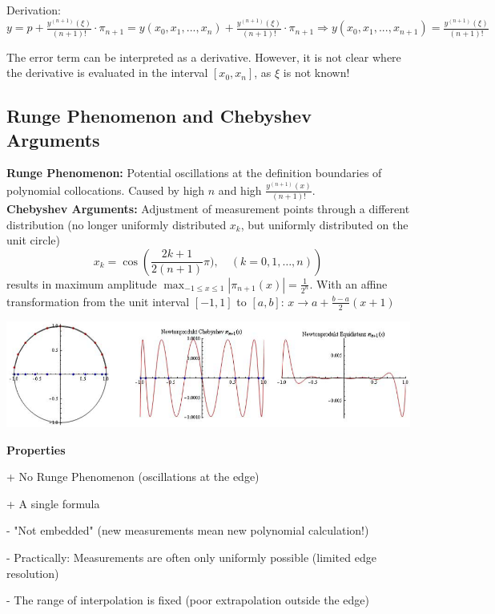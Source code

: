 Derivation: $y = p + \frac{y^{(n+1)}(\xi)}{(n+1)!} \cdot \pi_{n+1} = y(x_0,x_1,...,x_n) + \frac{y^{(n+1)}(\xi)}{(n+1)!} \cdot \pi_{n+1} \Longrightarrow y(x_0,x_1,...,x_{n+1}) = \frac{y^{(n+1)}(\xi)}{(n+1)!}$

The error term can be interpreted as a derivative. However, it is not clear where the derivative is evaluated in the interval $[x_0,x_n]$, as $\xi$ is not known!

\subsection{Runge Phenomenon and Chebyshev Arguments}
\textbf{Runge Phenomenon:} Potential oscillations at the definition boundaries of polynomial collocations.
Caused by high $n$ and high $\frac{y^{(n+1)}(x)}{(n+1)!}$. \\
\textbf{Chebyshev Arguments:} Adjustment of measurement points through a different distribution (no longer uniformly distributed $x_k$, but uniformly distributed on the unit circle)
\[x_k = \cos({\frac{2k+1}{2(n+1)}\pi), \quad (k=0,1,\ldots,n)}) \]
results in maximum amplitude $\max_{-1\leq x\leq 1}|\pi_{n+1}(x)| = \frac{1}{2^n}$.
With an affine transformation from the unit interval $[-1,1]$ to $[a,b]$: $x \rightarrow a+\frac{b-a}{2}(x+1)$
\begin{center}
\includegraphics[width=14cm]{bilder/TschbyNewtonVergleich.png}
\end{center}

\textbf{Properties}
\begin{liste}
  \item[+] No Runge Phenomenon (oscillations at the edge)
  \item[+] A single formula
  \item[-] "Not embedded" (new measurements mean new polynomial calculation!)
  \item[-] Practically: Measurements are often only uniformly possible (limited edge resolution)
  \item[-] The range of interpolation is fixed (poor extrapolation outside the edge)
\end{liste}


